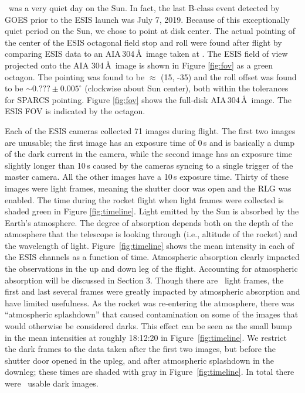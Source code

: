 	    \dateMission\ was a very quiet day on the Sun.  In fact, the last  B-class event detected by GOES \citep{GOES} prior to the ESIS launch was July 7, 2019.  Because of this exceptionally quiet period on the Sun, we chose to point at disk center. 
	    The actual pointing of the center of the ESIS octagonal field stop and roll were found after flight by comparing ESIS  data to an AIA\,304\,\AA\ image taken at .  
	    The ESIS field of view projected onto the AIA 304\,\AA\ image is shown in Figure \ref{fig:fov} as a green octagon.  
	    The pointing was found to be $\approx$ (15\arcsec, -35\arcsec) and the roll offset was found to be $\sim0.???\pm 0.005^\circ$ (clockwise about Sun center), both within the tolerances for SPARCS pointing.  
	    Figure \ref{fig:fov} shows the full-disk AIA\,304\,\AA\ image. 
	    The ESIS FOV is indicated by the octagon.  
	    
		Each of the ESIS cameras collected 71 images during flight.  The first two images are unusable; the first image has an exposure time of 0\,s and is basically a dump of the dark current in the camera, while the second image has an exposure time slightly longer than 10\,s caused by the cameras syncing to a single trigger of the master camera.  
		All the other images have a 10\,s exposure time.  Thirty of these images were light frames, meaning the shutter door was open and the RLG was enabled. 
		The time during the rocket flight when light frames were collected is shaded green in Figure \ref{fig:timeline}.  
		Light emitted by the Sun is absorbed by the Earth's atmosphere.  
		The degree of absorption depends both on the depth of the atmosphere that the telescope is looking through (i.e., altitude of the rocket) and the wavelength of light.  
		Figure~\ref{fig:timeline} shows the mean intensity in each of the ESIS channels as a function of time.  Atmospheric absorption clearly impacted the observations in the up and down leg of the flight.  
		Accounting for atmospheric absorption will be discussed in Section 3.  
		Though there are \numDataFrames\ light frames, the first and last several frames were greatly impacted by atmospheric absorption and have limited usefulness.  As the rocket was re-entering the atmosphere, there was  ``atmospheric splashdown'' that caused contamination on some of the images that would otherwise be considered darks.  
		This effect can be seen as the small bump in the mean intensities at roughly 18:12:20 in Figure~\ref{fig:timeline}.  
		We restrict the dark frames to the data taken after the first two images, but before the shutter door opened in the upleg, and after atmospheric splashdown in the downleg; these times are shaded with gray in Figure~\ref{fig:timeline}.  
		In total there were \numDarkFrames\ usable dark images.  
		
